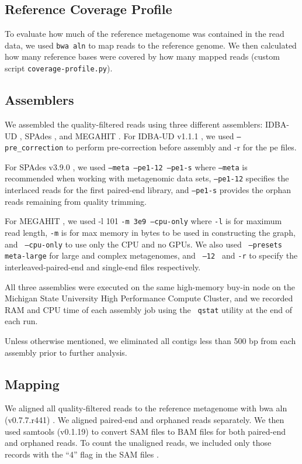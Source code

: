 \documentclass[10pt,a4paper,twocolumn]{article}
\begin{document}
\subsection*{Reference Coverage Profile}

To evaluate how much of the reference metagenome was contained in the read
data, we used {\tt bwa aln} to map reads to the reference genome.  We then
calculated how many reference bases were covered by how many mapped
reads (custom script {\tt coverage-profile.py}).

\subsection*{Assemblers}
We assembled the quality-filtered reads using three different assemblers: IDBA-UD
\cite{idba}, SPAdes \cite{spades}, and MEGAHIT \cite{megahit}.  For
IDBA-UD v1.1.1 \cite{idba}, we used {\tt {--pre\_correction}} to
perform pre-correction before assembly and -r for the pe files.

For SPAdes v3.9.0 \cite{spades}, we used { \tt {--meta --pe1-12
    --pe1-s}} where {\tt{--meta}} is recommended when working with
metagenomic data sets, {\tt{--pe1-12}} specifies the interlaced reads
for the first paired-end library, and {\tt{--pe1-s}} provides the
orphan reads remaining from quality trimming.

For MEGAHIT \cite{megahit}, we used -l 101 {\tt{-m 3e9
    --cpu-only}} where {\tt -l} is for maximum read length, {\tt -m} is
for max memory in bytes to be used in constructing the graph, and {\tt
  {--cpu-only}} to use only the CPU and no GPUs. We also used {\tt
  {--presets meta-large}} for large and complex metagenomes, and {\tt
  {--12} } and {\tt{-r}} to specify the
interleaved-paired-end and single-end files respectively.

All three assemblies were executed on the same high-memory buy-in node
on the Michigan State University High Performance Compute Cluster, and
we recorded RAM and CPU time of each assembly job using the {\tt
  qstat} utility at the end of each run.

Unless otherwise mentioned, we eliminated all contigs less than 500 bp
from each assembly prior to further analysis.

\subsection*{Mapping}

We aligned all quality-filtered reads to the reference metagenome with
bwa aln (v0.7.7.r441) \cite{bwa}. We aligned paired-end and orphaned
reads separately. We then used samtools (v0.1.19)
\cite{sam-stools} to convert SAM files to BAM files for both
paired-end and orphaned reads. To count the unaligned reads, we
included only those records with the ``4'' flag in the SAM files
\cite{sam-stools}.
 
\end{document}
